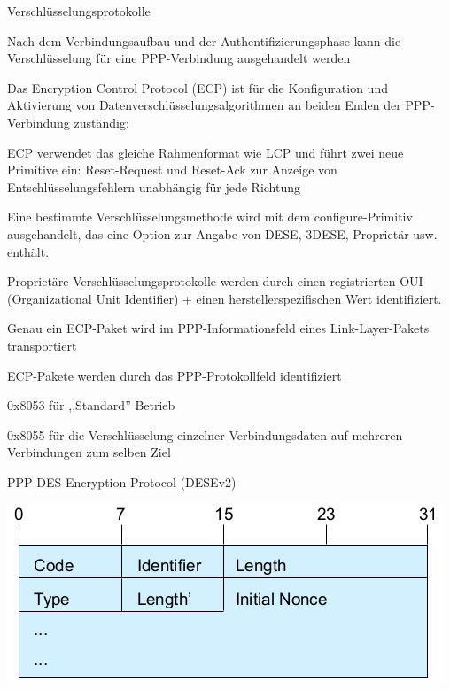 \documentclass[a4paper]{article}
\begin{document}
\begin{multicols}{3}
      Verschlüsselungsprotokolle
      \begin{itemize*}
            \item Nach dem Verbindungsaufbau und der Authentifizierungsphase kann die Verschlüsselung für eine PPP-Verbindung ausgehandelt werden
            \item Das Encryption Control Protocol (ECP) ist für die Konfiguration und Aktivierung von Datenverschlüsselungsalgorithmen an beiden Enden der PPP-Verbindung zuständig:
            \begin{itemize*}
                  \item ECP verwendet das gleiche Rahmenformat wie LCP und führt zwei neue Primitive ein: Reset-Request und Reset-Ack zur Anzeige von Entschlüsselungsfehlern unabhängig für jede Richtung %
                  \item Eine bestimmte Verschlüsselungsmethode wird mit dem configure-Primitiv ausgehandelt, das eine Option zur Angabe von DESE, 3DESE, Proprietär usw. enthält.
                  \item Proprietäre Verschlüsselungsprotokolle werden durch einen registrierten OUI (Organizational Unit Identifier) + einen herstellerspezifischen Wert identifiziert.
                  \item Genau ein ECP-Paket wird im PPP-Informationsfeld eines Link-Layer-Pakets transportiert
                  \item ECP-Pakete werden durch das PPP-Protokollfeld identifiziert
                  \begin{itemize*}
                        \item 0x8053 für ,,Standard'' Betrieb
                        \item 0x8055 für die Verschlüsselung einzelner Verbindungsdaten auf mehreren Verbindungen zum selben Ziel
                  \end{itemize*}
            \end{itemize*}
            \item PPP DES Encryption Protocol (DESEv2)
            \begin{itemize*}
                  \item \includegraphics[width=.5\linewidth]{Assets/NetworkSecurity-Point-to-Point-DESE.png}

\end{itemize*}
\end{itemize*}
\end{multicols}
\end{document}

